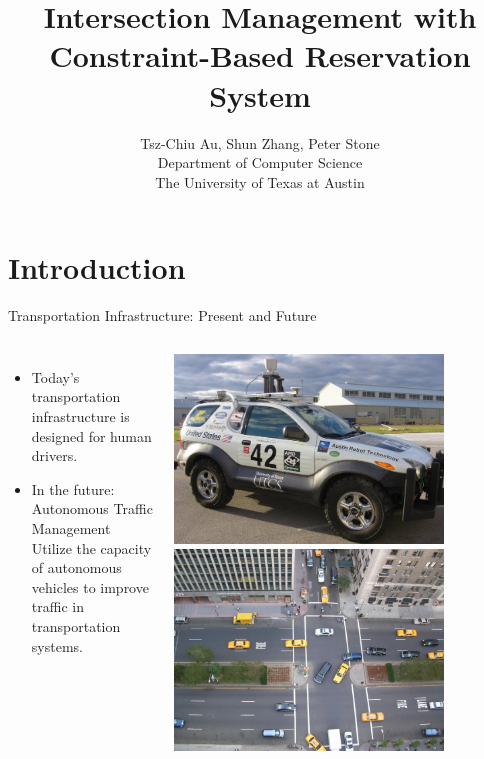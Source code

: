 \documentclass{beamer}
\title{Intersection Management with Constraint-Based Reservation
System}
\author{Tsz-Chiu Au, Shun Zhang, Peter Stone\\ Department of Computer
Science\\ The University of Texas at Austin}
\begin{document}
\begin{frame}
\titlepage
\end{frame}

\section{Introduction}

\begin{frame}{Transportation Infrastructure: Present and Future}
\begin{columns}[c]
		\begin{itemize}
		\item Today’s transportation infrastructure is designed for
		human drivers.
		\item In the future: Autonomous Traffic Management\\
		Utilize the capacity of autonomous vehicles to improve traffic
		in transportation systems.
		\end{itemize}
		
		\includegraphics[width=0.8\textwidth]{42.png}
		\hfill
		\includegraphics[width=0.8\textwidth]{intersection.jpg}
\end{columns}
\end{frame}
\end{document}
